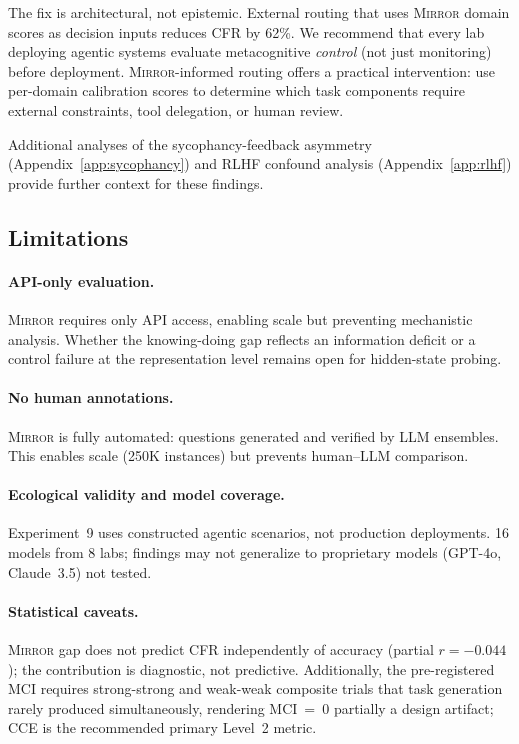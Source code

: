 \documentclass[10pt]{article}
\newcommand{\mirror}{\textsc{Mirror}}
\newcommand{\MCI}{MCI}
\newcommand{\CCE}{CCE}
\newcommand{\CFR}{CFR}
\begin{document}
The fix is architectural, not epistemic. External routing that uses \mirror{}
domain scores as decision inputs reduces \CFR{} by 62\%. We recommend that every
lab deploying agentic systems evaluate metacognitive \textit{control} (not just
monitoring) before deployment. \mirror{}-informed routing offers a practical
intervention: use per-domain calibration scores to determine which task components
require external constraints, tool delegation, or human review.

Additional analyses of the sycophancy-feedback asymmetry (Appendix~\ref{app:sycophancy}) and RLHF confound analysis (Appendix~\ref{app:rlhf}) provide further context for these findings.

\subsection{Limitations}

\paragraph{API-only evaluation.}
\mirror{} requires only API access, enabling scale but preventing mechanistic
analysis. Whether the knowing-doing gap reflects an information deficit or a
control failure at the representation level remains open for hidden-state probing.

\paragraph{No human annotations.}
\mirror{} is fully automated: questions generated and verified by LLM ensembles.
This enables scale (250K instances) but prevents human--LLM comparison.

\paragraph{Ecological validity and model coverage.}
Experiment~9 uses constructed agentic scenarios, not production deployments. 16 models from 8 labs; findings may not generalize to proprietary models (GPT-4o, Claude~3.5) not tested.

\paragraph{Statistical caveats.}
\mirror{} gap does not predict \CFR{} independently of accuracy (partial $r = -0.044$); the contribution is diagnostic, not predictive. Additionally, the pre-registered \MCI{} requires strong-strong and weak-weak composite trials that task generation rarely produced simultaneously, rendering \MCI{}~=~0 partially a design artifact; \CCE{} is the recommended primary Level~2 metric.
\end{document}
